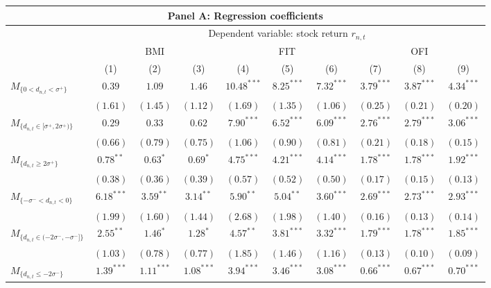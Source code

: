\begin{tabular}{lccccccccc}
  \hline \multicolumn{10}{c}{Panel A: Regression coefficients} \\
 \hline
                                    & \multicolumn{9}{c}{Dependent variable: stock return $r_{n,t}$} \\

                                    \cmidrule(l){2-10} & \multicolumn{3}{c}{BMI} & \multicolumn{3}{c}{FIT} & \multicolumn{3}{c}{OFI} \\
 \cmidrule(l){2-4} \cmidrule(l){5-7} \cmidrule(l){8-10} 
  & (1) & (2) & (3) & (4) & (5) & (6) & (7) & (8) & (9) \\ 
  $M_{\{0 < d_{n,t} < \sigma^+\}}$ & $0.39$ & $1.09$ & $1.46$ & $10.48^{***}$ & $8.25^{***}$ & $7.32^{***}$ & $3.79^{***}$ & $3.87^{***}$ & $4.34^{***}$ \\
   & $(1.61)$ & $(1.45)$ & $(1.12)$ & $(1.69)$ & $(1.35)$ & $(1.06)$ & $(0.25)$ & $(0.21)$ & $(0.20)$ \\
  $M_{\{d_{n,t} \in [\sigma^+, 2\sigma^+)\}}$ & $0.29$ & $0.33$ & $0.62$ & $7.90^{***}$ & $6.52^{***}$ & $6.09^{***}$ & $2.76^{***}$ & $2.79^{***}$ & $3.06^{***}$ \\
   & $(0.66)$ & $(0.79)$ & $(0.75)$ & $(1.06)$ & $(0.90)$ & $(0.81)$ & $(0.21)$ & $(0.18)$ & $(0.15)$ \\
  $M_{\{d_{n,t} \ge 2\sigma^+\}}$ & $0.78^{**}$ & $0.63^{*}$ & $0.69^{*}$ & $4.75^{***}$ & $4.21^{***}$ & $4.14^{***}$ & $1.78^{***}$ & $1.78^{***}$ & $1.92^{***}$ \\
   & $(0.38)$ & $(0.36)$ & $(0.39)$ & $(0.57)$ & $(0.52)$ & $(0.50)$ & $(0.17)$ & $(0.15)$ & $(0.13)$ \\
  $M_{\{-\sigma^- < d_{n,t} < 0\}}$ & $6.18^{***}$ & $3.59^{**}$ & $3.14^{**}$ & $5.90^{**}$ & $5.04^{**}$ & $3.60^{***}$ & $2.69^{***}$ & $2.73^{***}$ & $2.93^{***}$ \\
   & $(1.99)$ & $(1.60)$ & $(1.44)$ & $(2.68)$ & $(1.98)$ & $(1.40)$ & $(0.16)$ & $(0.13)$ & $(0.14)$ \\
  $M_{\{d_{n,t} \in (-2\sigma^-, -\sigma^-]\}}$ & $2.55^{**}$ & $1.46^{*}$ & $1.28^{*}$ & $4.57^{**}$ & $3.81^{***}$ & $3.32^{***}$ & $1.79^{***}$ & $1.78^{***}$ & $1.85^{***}$ \\
   & $(1.03)$ & $(0.78)$ & $(0.77)$ & $(1.85)$ & $(1.46)$ & $(1.16)$ & $(0.13)$ & $(0.10)$ & $(0.09)$ \\
  $M_{\{d_{n,t} \le -2\sigma^-\}}$ & $1.39^{***}$ & $1.11^{***}$ & $1.08^{***}$ & $3.94^{***}$ & $3.46^{***}$ & $3.08^{***}$ & $0.66^{***}$ & $0.67^{***}$ & $0.70^{***}$ \\

\end{tabular}
